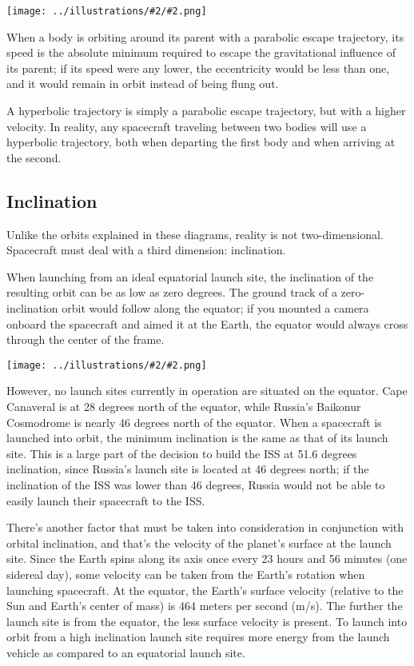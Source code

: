 \documentclass[oneside,a5paper]{book}
\newcommand{\widthillustration}[2]{{\centering\texttt{[image: ../illustrations/\#2/\#2.png]}}}
\newcommand{\illustration}[1]{\widthillustration{\linewidth}{#1}}
\begin{document}
\illustration{eccentricity}

When a body is orbiting around its parent with a parabolic escape
trajectory, its speed is the absolute minimum required to escape the
gravitational influence of its parent; if its speed were any lower,
the eccentricity would be less than one, and it would remain in orbit
instead of being flung out.

A hyperbolic trajectory is simply a parabolic escape trajectory, but
with a higher velocity. In reality, any spacecraft traveling between
two bodies will use a hyperbolic trajectory, both when departing the
first body and when arriving at the second.

\subsection{Inclination}

Unlike the orbits explained in these diagrams, reality is not
two-dimensional. Spacecraft must deal with a third dimension:
inclination.

When launching from an ideal equatorial launch site, the inclination
of the resulting orbit can be as low as zero degrees. The ground track
of a zero-inclination orbit would follow along the equator; if you
mounted a camera onboard the spacecraft and aimed it at the Earth, the
equator would always cross through the center of the frame.

\illustration{inclination}

However, no launch sites currently in operation are situated on the
equator. Cape Canaveral is at 28 degrees north of the equator, while
Russia’s Baikonur Cosmodrome is nearly 46 degrees north of the
equator. When a spacecraft is launched into orbit, the minimum
inclination is the same as that of its launch site. This is a large
part of the decision to build the ISS at 51.6 degrees inclination,
since Russia’s launch site is located at 46 degrees north; if the
inclination of the ISS was lower than 46 degrees, Russia would not be
able to easily launch their spacecraft to the ISS.

There’s another factor that must be taken into consideration in
conjunction with orbital inclination, and that’s the velocity of the
planet’s surface at the launch site. Since the Earth spins along its
axis once every 23 hours and 56 minutes (one sidereal day), some
velocity can be taken from the Earth’s rotation when launching
spacecraft. At the equator, the Earth’s surface velocity (relative to
the Sun and Earth’s center of mass) is 464 meters per second
(m/s). The further the launch site is from the equator, the less
surface velocity is present. To launch into orbit from a high
inclination launch site requires more energy from the launch vehicle
as compared to an equatorial launch site.
\end{document}
